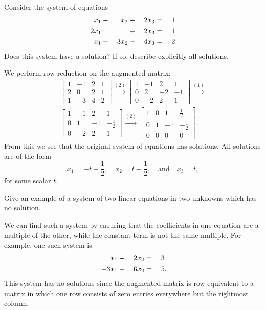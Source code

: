  Consider the system of equations
\begin{alignat*}{4}
  x_1 &{}-{}& x_2 &{}+{}& 2x_3 &{}={}& 1 \\
  2x_1 && &{}+{}& 2x_3 &{}={}& 1 \\
  x_1 &{}-{}& 3x_2 &{}+{}& 4x_3 &{}={}& 2\rlap.
\end{alignat*}
Does this system have a solution? If so, describe explicitly all
solutions.
\begin{solution}
  We perform row-reduction on the augmented matrix:
  \begin{gather*}
    \begin{bmatrix}
      1 & -1 & 2 & 1 \\
      2 & 0 & 2 & 1 \\
      1 & -3 & 4 & 2
    \end{bmatrix}
    \xrightarrow{(2)}
    \begin{bmatrix}
      1 & -1 & 2 & 1 \\
      0 & 2 & -2 & -1 \\
      0 & -2 & 2 & 1
    \end{bmatrix}
    \xrightarrow{(1)} \\
    \begin{bmatrix}
      1 & -1 & 2 & 1 \\
      0 & 1 & -1 & -\frac12 \\
      0 & -2 & 2 & 1
    \end{bmatrix}
    \xrightarrow{(2)}
    \begin{bmatrix}
      1 & 0 & 1 & \frac12 \\[3pt]
      0 & 1 & -1 & -\frac12 \\[3pt]
      0 & 0 & 0 & 0
    \end{bmatrix}.
  \end{gather*}
  From this we see that the original system of equations has
  solutions. All solutions are of the form
  \begin{equation*}
    x_1 = -t + \frac12,
    \quad
    x_2 = t - \frac12,
    \quad\text{and}\quad
    x_3 = t,
  \end{equation*}
  for some scalar $t$.
\end{solution}

 Give an example of a system of two linear equations in two
unknowns which has no solution.
\begin{solution}
  We can find such a system by ensuring that the coefficients in one
  equation are a multiple of the other, while the constant term is not
  the same multiple. For example, one such system is
  \begin{alignat*}{3}
    x_1 &{}+{}& 2x_2 &{}={}& 3 \\
    -3x_1 &{}-{}& 6x_2 &{}={}& 5\rlap.
  \end{alignat*}
  This system has no solutions since the augmented matrix is
  row-equivalent to a matrix in which one row consists of zero entries
  everywhere but the rightmost column.
\end{solution}

